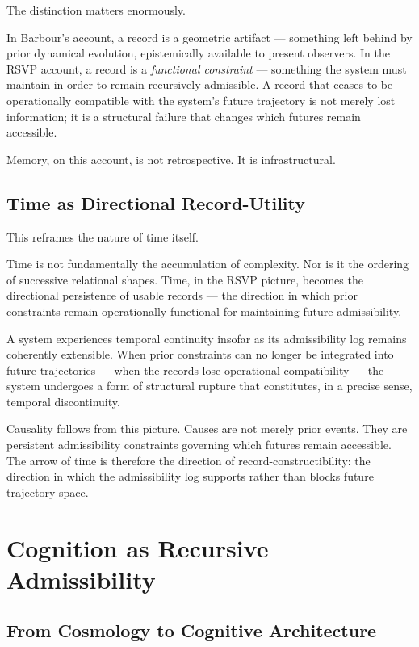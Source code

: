 \documentclass[12pt, a4paper]{article}
\begin{document}
The distinction matters enormously.

In Barbour's account, a record is a geometric artifact — something left
behind by prior dynamical evolution, epistemically available to present
observers. In the RSVP account, a record is a \emph{functional constraint}
— something the system must maintain in order to remain recursively
admissible. A record that ceases to be operationally compatible with the
system's future trajectory is not merely lost information; it is a structural
failure that changes which futures remain accessible.

Memory, on this account, is not retrospective. It is infrastructural.

\subsection{Time as Directional Record-Utility}

This reframes the nature of time itself.

Time is not fundamentally the accumulation of complexity. Nor is it the
ordering of successive relational shapes. Time, in the RSVP picture,
becomes the directional persistence of usable records — the direction in
which prior constraints remain operationally functional for maintaining
future admissibility.

A system experiences temporal continuity insofar as its admissibility log
remains coherently extensible. When prior constraints can no longer be
integrated into future trajectories — when the records lose operational
compatibility — the system undergoes a form of structural rupture that
constitutes, in a precise sense, temporal discontinuity.

Causality follows from this picture. Causes are not merely prior events.
They are persistent admissibility constraints governing which futures remain
accessible. The arrow of time is therefore the direction of
record-constructibility: the direction in which the admissibility log
supports rather than blocks future trajectory space.

\section{Cognition as Recursive Admissibility}

\subsection{From Cosmology to Cognitive Architecture}
\end{document}
